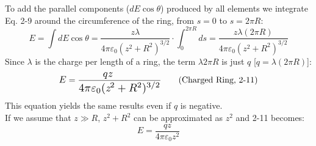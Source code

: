 \documentclass[12pt, a4paper]{article}
\begin{document}
		To add the parallel components ($dE\cos\theta$) produced by all elements we integrate Eq. 2-9 around the circumference of the ring, from $s = 0$ to $s = 2\pi R$:
		\begin{equation*}
			E = \int dE\cos\theta = \frac{\textit{z}\lambda}{4\pi\varepsilon_0(\textit{z}^2+R^2)^{3/2}} \cdot
			\int_{0}^{2\pi R}ds = 
 			\frac{\textit{z}\lambda (2\pi R)}{4\pi\varepsilon_0(\textit{z}^2 + R^2)^{3/2}} 
			\tag{2-10}
		\end{equation*} 
		Since $\lambda$ is the charge per length of a ring, the term $\lambda2\pi R$ is just $q$ [$q = \lambda(2\pi R)$]:
		\begin{equation*}
			\scalebox{1.1}{$E$} = 
				\frac{\scalebox{1.2}{$q\textit{z}$}}
				     {\scalebox{1.3}{$4\pi\varepsilon_0(\textit{z}^2 + R^2)^{3/2}$}}
			\tag{Charged Ring, 2-11}
		\end{equation*}
		This equation yields the same results even if $q$ is negative. \\
		If we assume that $\textit{z} \gg R$, $\textit{z}^2 + R^2$ can be approximated as $\textit{z}^2$ and 2-11 becomes:
		\begin{equation*}
			E = \frac{q\textit{z}}{4\pi\varepsilon_0 \textit{z}^2} 
			\tag{Charged Ring at Large Distances, 2-12}
		\end{equation*}
		
		
\end{document}

